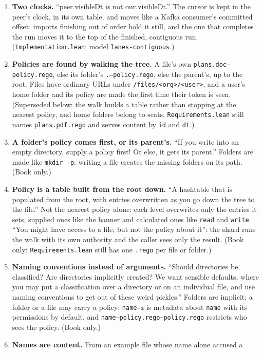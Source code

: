 \begin{enumerate}
\item \textbf{Two clocks.} ``peer.visibleDt is not our.visibleDt.'' The cursor
  is kept in the peer's clock, in its own table, and moves like a Kafka consumer's
  committed offset: imports finishing out of order hold it still, and the one that
  completes the run moves it to the top of the finished, contiguous run.
  (\texttt{Implementation.lean}; model \texttt{lanes-contiguous}.)
\item \textbf{Policies are found by walking the tree.} A file's own
  \texttt{plans.doc--policy.rego}, else its folder's \texttt{.--policy.rego}, else
  the parent's, up to the root. Files have ordinary URLs under
  \texttt{/files/<org>/<user>}, and a user's home folder and its policy are made
  the first time their token is seen. (Superseded below: the walk builds a table
  rather than stopping at the nearest policy, and home folders belong to seats.
  \texttt{Requirements.lean} still names \texttt{plans.pdf.rego} and serves content
  by \texttt{id} and \texttt{dt}.)
\item \textbf{A folder's policy comes first, or its parent's.} ``If you write into
  an empty directory, supply a policy first! Or else, it gets its parent.'' Folders
  are made like \texttt{mkdir -p}: writing a file creates the missing folders on
  its path. (Book only.)
\item \textbf{Policy is a table built from the root down.} ``A hashtable that is
  populated from the root, with entries overwritten as you go down the tree to the
  file.'' Not the nearest policy alone: each level overwrites only the entries it
  sets, supplied ones like the banner and calculated ones like \texttt{read} and
  \texttt{write}. ``You might have access to a file, but not the policy about it'': the
  shard runs the walk with its own authority and the caller sees only the result.
  (Book only: \texttt{Requirements.lean} still has one \texttt{.rego} per file or
  folder.)
\item \textbf{Naming conventions instead of arguments.} ``Should directories be
  classified? Are directories implicitly created? We want sensible defaults, where
  you may put a classification over a directory or on an individual file, and use
  naming conventions to get out of these weird pickles.'' Folders are implicit; a
  folder or a file may carry a policy; \texttt{name--}\textit{x} is metadata about
  \texttt{name} with its permissions by default, and
  \texttt{name--policy.rego--policy.rego} restricts who sees the policy. (Book
  only.)
\item \textbf{Names are content.} From an example file whose name alone accused a

\end{enumerate}
